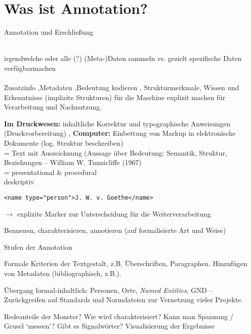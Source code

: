 

\section{Was ist Annotation?}
\begin{frame}{Annotation und Erschließung}

\\
irgendwelche oder alle (?) (Meta-)Daten sammeln vs. gezielt spezifische Daten verfügbarmachen \\

\\
Zusatzinfo \sep Metadaten \sep Bedeutung kodieren \sep 
Strukturmerkmale, Wissen und Erkenntnisse (implizite Strukturen) für die Maschine explizit machen für Verarbeitung und Nachnutzung. 

\textbf{Im Druckwesen:} inhaltliche Korrektur und typographische Anweisungen (Druckvorbereitung) \sep
\textbf{Computer:} Einbettung von Markup in elektronische Dokumente (log. Struktur beschreiben) \\

 = Text mit Auszeichnung (Aussage über Bedeutung: Semantik, Struktur, Beziehungen -- William W. Tunnicliffe (1967) \\

 = presentational \& procedural \\
 deskriptiv 
\begin{verbatim}
<name type="person">J. W. v. Goethe</name>
\end{verbatim}
$\to$ explizite Marker zur Unterscheidung für die Weiterverarbeitung
\smallskip

Bennenen, charakterisieren, annotieren (auf formalisierte Art und Weise)
\smallskip

\end{frame}



\begin{frame}[allowframebreaks]{Stufen der Annotation}

Formale Kriterien der Textgestalt, z.B. Überschriften, Paragraphen. Hinzufügen von Metadaten (bibliographisch, z.B.).

Übergang formal-inhaltlich:
Personen, Orte, \emph{Named Entities}, GND -- Zurückgreifen auf Standards und Normdateien zur Vernetzung vieler Projekte.

Redeanteile der Monster? Wie wird charakterisiert? Kann man Spannung / Grusel `messen'? Gibt es Signalwörter? Visualisierung der Ergebnisse

\end{frame}

